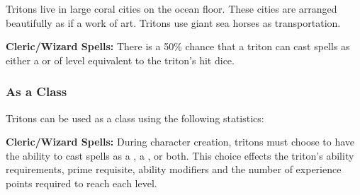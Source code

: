 \begin{multicols*}{2}
Tritons live in large coral cities on the ocean floor. These cities are arranged beautifully as if a work of art. Tritons use giant sea horses as transportation.

\textbf{Cleric/Wizard Spells:} There is a 50\% chance that a triton can cast spells as either a  or  of level equivalent to the triton's hit dice.

\subsubsection{As a Class}
Tritons can be used as a class using the following statistics:

\textbf{Cleric/Wizard Spells:} During character creation, tritons must choose to have the ability to cast spells as a , a , or both. This choice effects the triton's ability requirements, prime requisite, ability modifiers and the number of experience points required to reach each level.



\end{multicols*}
